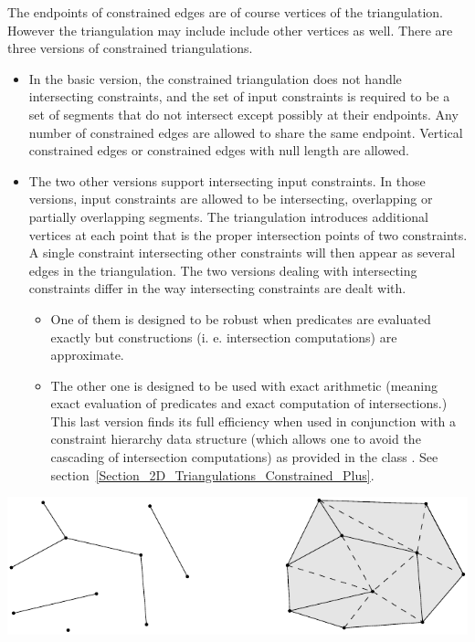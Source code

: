 The endpoints of constrained edges are of course vertices of the
triangulation. However the triangulation may include
include other vertices as well.
There are three versions of  constrained triangulations.
\begin{itemize}
\item
In the basic version, the constrained triangulation 
does not handle intersecting constraints, and the set of input 
constraints is required to be a set of segments that do not intersect
except possibly at their endpoints. Any number of constrained edges
are allowed to share the same endpoint.  Vertical constrained edges or
constrained edges with null length are allowed.
\item 
The two other versions support intersecting input constraints.
In those versions, input constraints are allowed to be
intersecting, overlapping or partially
overlapping segments.
The triangulation introduces  additional  vertices at each point that
is the proper intersection points of  two 
constraints. A single constraint intersecting other
constraints will then appear as several edges in the triangulation.
The two versions dealing with intersecting constraints differ
in the way intersecting constraints are dealt with.
\begin{itemize}
\item
 One of them is
designed to be robust when predicates are evaluated exactly but
constructions (i. e.  intersection computations) are
approximate.
\item
The other one is designed to be used 
with exact arithmetic (meaning exact
evaluation of predicates and exact computation of intersections.)
This last version finds its full efficiency  when used in conjunction
with a constraint hierarchy data structure (which allows one to avoid the
cascading of intersection computations)
as provided in the class
. See
section~\ref{Section_2D_Triangulations_Constrained_Plus}.
\end{itemize}
\end{itemize}


\begin{ccTexOnly}
\begin{center} \includegraphics{Triangulation_2/constraints} \end{center}
\end{ccTexOnly}
 
